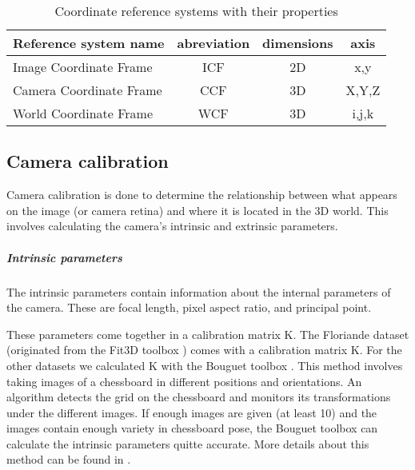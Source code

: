\begin{table}[ht]
	\caption{Coordinate reference systems with their properties}
	\label{tab:coord}
	\begin{tabular}{|l||c|c|c|}
	\hline
	Reference system name		&	abreviation	&	dimensions	&	axis\\
	\hline
	\hline
	Image Coordinate Frame	&   ICF			&	2D			& 	x,y\\
	\hline
	Camera Coordinate Frame	&   CCF			&	3D			& 	X,Y,Z\\
	\hline
	World Coordinate Frame	&   WCF			&	3D			& 	i,j,k\\
	\hline
	\end{tabular}
\end{table}


%  
%  

\subsection{Camera calibration}
\label{sec:cameraCalibration}
Camera calibration is done to determine
the relationship between what appears on the image (or camera retina) and where
 it is located in the 3D world. This involves calculating the camera's intrinsic
 and extrinsic parameters.

\subparagraph{Intrinsic parameters}
The intrinsic parameters contain information about the internal parameters
of the camera.  These are focal length, pixel aspect ratio, and principal point.

These parameters come together in a calibration matrix K.  The Floriande
dataset (originated from the Fit3D toolbox \cite{Fit3d}) comes with a
calibration matrix K.  For
the other datasets we calculated K with the Bouguet toolbox
\cite{bouguet}.
This method involves taking images of a chessboard in different positions and
orientations. An algorithm detects the grid on the chessboard and monitors its
transformations under the different images.  If enough images are given (at
least 10) and the images contain enough variety in chessboard pose, the Bouguet
toolbox can calculate the intrinsic parameters quitte accurate.
More details about this method can be found in \cite{bouguet}.

